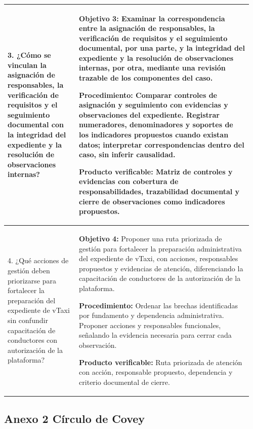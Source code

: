 {\begin{landscape}
\begin{longtable}{@{}p{0.28\linewidth}p{0.68\linewidth}@{}}
\midrule
3. ¿Cómo se vinculan la asignación de responsables, la verificación de requisitos y el seguimiento documental con la integridad del expediente y la resolución de observaciones internas? & \textbf{Objetivo 3:} Examinar la correspondencia entre la asignación de responsables, la verificación de requisitos y el seguimiento documental, por una parte, y la integridad del expediente y la resolución de observaciones internas, por otra, mediante una revisión trazable de los componentes del caso.\par\vspace{1mm}\textbf{Procedimiento:} Comparar controles de asignación y seguimiento con evidencias y observaciones del expediente. Registrar numeradores, denominadores y soportes de los indicadores propuestos cuando existan datos; interpretar correspondencias dentro del caso, sin inferir causalidad.\par\vspace{1mm}\textbf{Producto verificable:} Matriz de controles y evidencias con cobertura de responsabilidades, trazabilidad documental y cierre de observaciones como indicadores propuestos.\\
\midrule
4. ¿Qué acciones de gestión deben priorizarse para fortalecer la preparación del expediente de vTaxi sin confundir capacitación de conductores con autorización de la plataforma? & \textbf{Objetivo 4:} Proponer una ruta priorizada de gestión para fortalecer la preparación administrativa del expediente de vTaxi, con acciones, responsables propuestos y evidencias de atención, diferenciando la capacitación de conductores de la autorización de la plataforma.\par\vspace{1mm}\textbf{Procedimiento:} Ordenar las brechas identificadas por fundamento y dependencia administrativa. Proponer acciones y responsables funcionales, señalando la evidencia necesaria para cerrar cada observación.\par\vspace{1mm}\textbf{Producto verificable:} Ruta priorizada de atención con acción, responsable propuesto, dependencia y criterio documental de cierre.\\
\bottomrule\end{longtable}
\endgroup
\end{landscape}
\clearpage
\pagestyle{fancy}

\clearpage
\pagestyle{empty}
\begin{landscape}
\section*{Anexo 2 Círculo de Covey}


\end{landscape}}
